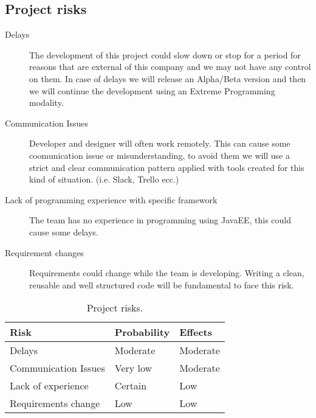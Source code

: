 \subsection{Project risks}

\begin{description}

\item[Delays] The development of this project could slow down or stop for a period for reasons that are external of this company and we may not have any control on them. In case of delays we will release an Alpha/Beta version and then we will continue the development using an Extreme Programming modality.

\item[Communication Issues] Developer and designer will often work remotely. This can cause some coomunication issue or misunderstanding, to avoid them we will use a strict and clear communication pattern applied with tools created for this kind of situation. (i.e. Slack, Trello ecc.)

\item[Lack of programming experience with specific framework] The team has no experience in programming using JavaEE, this could cause some delays.

\item[Requirement changes] Requirements could change while the team is developing. Writing a clean, reusable and well structured code will be fundamental to face this risk.

\end{description}
\begin{table}[p]
\centering
    \begin{tabular}{| l | l | l |}
        \hline
        \textbf{Risk}           & \textbf{Probability}  & \textbf{Effects}  \\
        \hline
        Delays                  & Moderate                  & Moderate          \\
        \hline
        Communication Issues   & Very low                   & Moderate          \\
        \hline
        Lack of experience      & Certain               & Low          \\
        \hline
        Requirements change     & Low            & Low          \\
        \hline
    \end{tabular}
    \caption{Project risks.}
    \label{tab:project-risks}
\end{table}